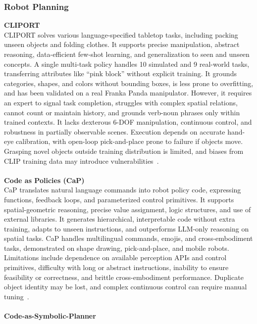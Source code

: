 \documentclass[12pt]{extarticle}
\begin{document}
\subsubsection{Robot Planning}

\textbf{CLIPORT} \\
CLIPORT solves various language-specified tabletop tasks, including packing unseen objects and folding clothes. It supports precise manipulation, abstract reasoning, data-efficient few-shot learning, and generalization to seen and unseen concepts. A single multi-task policy handles 10 simulated and 9 real-world tasks, transferring attributes like “pink block” without explicit training. It grounds categories, shapes, and colors without bounding boxes, is less prone to overfitting, and has been validated on a real Franka Panda manipulator. However, it requires an expert to signal task completion, struggles with complex spatial relations, cannot count or maintain history, and grounds verb-noun phrases only within trained contexts. It lacks dexterous 6-DOF manipulation, continuous control, and robustness in partially observable scenes. Execution depends on accurate hand-eye calibration, with open-loop pick-and-place prone to failure if objects move. Grasping novel objects outside training distribution is limited, and biases from CLIP training data may introduce vulnerabilities~\cite{cliport}. \\ \\
\textbf{Code as Policies (CaP)} \\
CaP translates natural language commands into robot policy code, expressing functions, feedback loops, and parameterized control primitives. It supports spatial-geometric reasoning, precise value assignment, logic structures, and use of external libraries. It generates hierarchical, interpretable code without extra training, adapts to unseen instructions, and outperforms LLM-only reasoning on spatial tasks. CaP handles multilingual commands, emojis, and cross-embodiment tasks, demonstrated on shape drawing, pick-and-place, and mobile robots. Limitations include dependence on available perception APIs and control primitives, difficulty with long or abstract instructions, inability to ensure feasibility or correctness, and brittle cross-embodiment performance. Duplicate object identity may be lost, and complex continuous control can require manual tuning~\cite{code-as-policies}. \\ \\
\textbf{Code-as-Symbolic-Planner} \\
\end{document}
